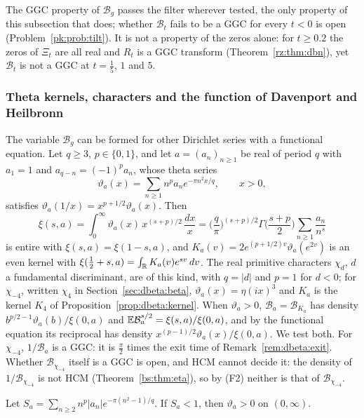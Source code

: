 The GGC property of $\mathcal B_g$ passes the filter wherever tested, the only property of this subsection that does; whether $\mathcal B_t$ fails to be a GGC for every $t<0$ is open (Problem~\ref{pk:prob:tilt}). It is not a property of the zeros alone: for $t\ge0.2$ the zeros of $\Xi_t$ are all real \cite{PT21} and $R_t$ is a GGC transform (Theorem~\ref{rz:thm:dbn}), yet $\mathcal B_t$ is not a GGC at $t=\frac15$, $1$ and $5$.

\subsubsection{Theta kernels, characters and the function of Davenport and Heilbronn}\label{pk:sec:theta}

The variable $\mathcal B_g$ can be formed for other Dirichlet series with a functional equation. Let $q\ge3$, $p\in\{0,1\}$, and let $a=(a_n)_{n\ge1}$ be real of period $q$ with $a_1=1$ and $a_{q-n}=(-1)^pa_n$, whose theta series
\[
\vartheta_a(x)=\sum_{n\ge1}n^pa_ne^{-\pi n^2x/q},\qquad x>0,
\]
satisfies $\vartheta_a(1/x)=x^{p+1/2}\vartheta_a(x)$. Then
\[
\xi(s,a)=\int_0^\infty\vartheta_a(x)\,x^{(s+p)/2}\,\frac{dx}x=\Big(\frac q\pi\Big)^{(s+p)/2}\Gamma\Big(\frac{s+p}2\Big)\sum_{n\ge1}\frac{a_n}{n^s}
\]
is entire with $\xi(s,a)=\xi(1-s,a)$, and $K_a(v)=2e^{(p+1/2)v}\vartheta_a(e^{2v})$ is an even kernel with $\xi(\frac12+s,a)=\int_{\mathbb{R}}K_a(v)e^{sv}\,dv$. The real primitive characters $\chi_d$, $d$ a fundamental discriminant, are of this kind, with $q=|d|$ and $p=1$ for $d<0$; for $\chi_{-4}$, written $\chi_4$ in Section~\ref{sec:dbeta:beta}, $\vartheta_a(x)=\eta(ix)^3$ and $K_a$ is the kernel $K_4$ of Proposition~\ref{prop:dbeta:kernel}. When $\vartheta_a>0$, $\mathcal B_a=\mathcal B_{K_a}$ has density $b^{p/2-1}\vartheta_a(b)/\xi(0,a)$ and $\mathbb{E}\mathcal B_a^{s/2}=\xi(s,a)/\xi(0,a)$, and by the functional equation its reciprocal has density $x^{(p-1)/2}\vartheta_a(x)/\xi(0,a)$. We test both. For $\chi_{-4}$, $1/\mathcal B_a$ is a GGC: it is $\frac\pi2$ times the exit time of Remark~\ref{rem:dbeta:exit}. Whether $\mathcal B_{\chi_{-4}}$ itself is a GGC is open, and HCM cannot decide it: the density of $1/\mathcal B_{\chi_{-4}}$ is not HCM (Theorem~\ref{bs:thm:eta}), so by (F2) neither is that of $\mathcal B_{\chi_{-4}}$.

\begin{lemma}\label{pk:lem:thetapos}
Let $S_a=\sum_{n\ge2}n^p|a_n|e^{-\pi(n^2-1)/q}$. If $S_a<1$, then $\vartheta_a>0$ on $(0,\infty)$.
\end{lemma}

